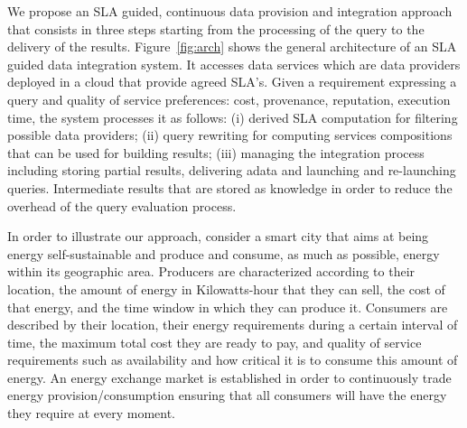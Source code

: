 We propose an SLA guided, continuous data provision and integration approach that consists in three steps  starting from the processing of the query  to the delivery of the results.
Figure~\ref{fig:arch} shows the general architecture of an SLA guided data integration system. It accesses data services which are data providers deployed in a cloud  that provide agreed SLA’s. 
Given a requirement expressing a query and quality of service preferences: cost, provenance, reputation, execution time, the system processes it  as follows: (i) derived SLA  computation for filtering possible data providers; (ii) query rewriting for computing services compositions that can be used for building results; (iii) managing the integration process including storing partial results, delivering adata and launching and re-launching queries. Intermediate results that are stored as knowledge in order to reduce the overhead of the query evaluation process. 


\begin{figure}
\end{figure}

In order to illustrate our approach, consider a smart city that aims at being energy self-sustainable and produce and consume, as much as possible, energy within its geographic area. 
Producers are characterized according to their location, the amount of energy in Kilowatts-hour that they can sell, the cost of that energy, and the time window in which they can produce it. 
Consumers are described by their location, their energy requirements during a certain interval of time, the maximum total cost they are ready to pay, and quality of service requirements such as availability and how critical it is to consume this amount of energy. 
An energy exchange market is established in order to continuously trade  energy provision/consumption ensuring that all consumers will have the energy they require at every moment.




